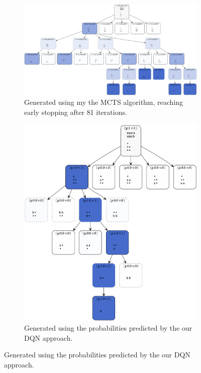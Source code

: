 \documentclass[12pt,a4paper]{article}
\begin{document}
\begin{figure}
  \centering
\begin{subfigure}{\textwidth}
  \centering
  \includegraphics[width=\linewidth]{img/nim-mcts.png}
  \centering 
  \caption{Generated using my the MCTS algorithm, reaching early stopping after 81 iterations.}
\end{subfigure}%
\hspace{10px}
\begin{subfigure}{.45\textwidth}
  \includegraphics[width=0.9\linewidth]{img/nim-rl.png}
  \centering 
  \caption{Generated using the probabilities predicted by the our DQN approach.}
\end{subfigure}

\end{figure}
\end{document}

